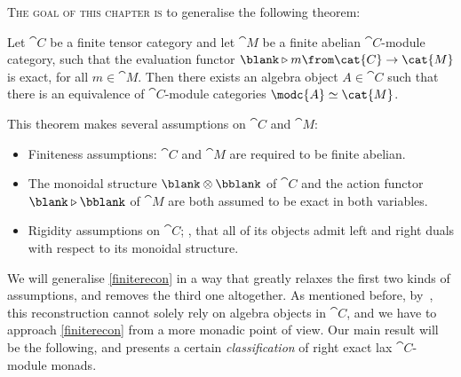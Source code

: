 \textsc{The goal of this chapter is}
to generalise the following theorem:

\begin{theoremalph}\label{finiterecon}
  Let \(\cat{C}\) be a finite tensor category
  and let \(\cat{M}\) be a finite abelian \(\cat{C}\)\hyp{}module category,
  such that the evaluation functor \(\blank \triangleright m \from \cat{C} \to \cat{M}\) is exact,
  for all \(m \in \cat{M}\).
  Then there exists an algebra object \(A \in \cat{C}\)
  such that there is an equivalence of \(\cat{C}\)\hyp{}module categories \(\modc{A} \simeq \cat{M}\).
\end{theoremalph}

\noindent{}This theorem makes several assumptions on \(\cat{C}\) and \(\cat{M}\):
\begin{itemize}[noitemsep]
  \item Finiteness assumptions: \(\cat{C}\) and \(\cat{M}\) are required to be finite abelian.
  \item The monoidal structure \(\blank \otimes \bblank\) of \(\cat{C}\)
  and the action functor \(\blank \triangleright \bblank\) of \(\cat{M}\)
  are both assumed to be exact in both variables.
  \item Rigidity assumptions on \(\cat{C}\);
  \ie, that all of its objects admit left and right duals with respect to its monoidal structure.
\end{itemize}

We will generalise \cref{finiterecon} in a way that greatly relaxes the first two kinds of assumptions,
and removes the third one altogether.
As mentioned before,
by~\cite[Example~2.20]{douglas19},
this reconstruction cannot solely rely on algebra objects in \(\cat{C}\),
and we have to approach \cref{finiterecon} from a more monadic point of view.
Our main result will be the following,
and presents a certain \emph{classification} of right exact lax \(\cat{C}\)\hyp{}module monads.

